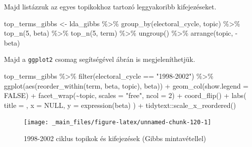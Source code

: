 \documentclass[
]{book}
\newenvironment{Shaded}{\begin{snugshade}}{\end{snugshade}}
\newcommand{\AttributeTok}[1]{\textcolor[rgb]{0.77,0.63,0.00}{#1}}
\newcommand{\ConstantTok}[1]{\textcolor[rgb]{0.00,0.00,0.00}{#1}}
\newcommand{\DecValTok}[1]{\textcolor[rgb]{0.00,0.00,0.81}{#1}}
\newcommand{\FunctionTok}[1]{\textcolor[rgb]{0.00,0.00,0.00}{#1}}
\newcommand{\NormalTok}[1]{#1}
\newcommand{\OtherTok}[1]{\textcolor[rgb]{0.56,0.35,0.01}{#1}}
\newcommand{\SpecialCharTok}[1]{\textcolor[rgb]{0.00,0.00,0.00}{#1}}
\newcommand{\StringTok}[1]{\textcolor[rgb]{0.31,0.60,0.02}{#1}}
\begin{document}
Majd listázzuk az egyes topikokhoz tartozó leggyakoribb kifejezéseket.

\begin{Shaded}
\begin{Highlighting}[]
\NormalTok{top\_terms\_gibbs }\OtherTok{\textless{}{-}}\NormalTok{ lda\_gibbs }\SpecialCharTok{\%\textgreater{}\%}
  \FunctionTok{group\_by}\NormalTok{(electoral\_cycle, topic) }\SpecialCharTok{\%\textgreater{}\%}
  \FunctionTok{top\_n}\NormalTok{(}\DecValTok{5}\NormalTok{, beta) }\SpecialCharTok{\%\textgreater{}\%}
  \FunctionTok{top\_n}\NormalTok{(}\DecValTok{5}\NormalTok{, term) }\SpecialCharTok{\%\textgreater{}\%}
  \FunctionTok{ungroup}\NormalTok{() }\SpecialCharTok{\%\textgreater{}\%}
  \FunctionTok{arrange}\NormalTok{(topic, }\SpecialCharTok{{-}}\NormalTok{beta)}
\end{Highlighting}
\end{Shaded}

Majd a \texttt{ggplot2} csomag segítségével ábrán is megjeleníthetjük.

\begin{Shaded}
\begin{Highlighting}[]
\NormalTok{top\_terms\_gibbs }\SpecialCharTok{\%\textgreater{}\%}
  \FunctionTok{filter}\NormalTok{(electoral\_cycle }\SpecialCharTok{==} \StringTok{"1998{-}2002"}\NormalTok{) }\SpecialCharTok{\%\textgreater{}\%}
  \FunctionTok{ggplot}\NormalTok{(}\FunctionTok{aes}\NormalTok{(}\FunctionTok{reorder\_within}\NormalTok{(term, beta, topic), beta)) }\SpecialCharTok{+}
  \FunctionTok{geom\_col}\NormalTok{(}\AttributeTok{show.legend =} \ConstantTok{FALSE}\NormalTok{) }\SpecialCharTok{+}
  \FunctionTok{facet\_wrap}\NormalTok{(}\SpecialCharTok{\textasciitilde{}}\NormalTok{topic, }\AttributeTok{scales =} \StringTok{"free"}\NormalTok{, }\AttributeTok{ncol =} \DecValTok{2}\NormalTok{) }\SpecialCharTok{+}
  \FunctionTok{coord\_flip}\NormalTok{() }\SpecialCharTok{+}
  \FunctionTok{labs}\NormalTok{(}
    \AttributeTok{title =}\NormalTok{ ,}
    \AttributeTok{x =} \ConstantTok{NULL}\NormalTok{,}
    \AttributeTok{y =} \FunctionTok{expression}\NormalTok{(beta)}
\NormalTok{  ) }\SpecialCharTok{+}
\NormalTok{  tidytext}\SpecialCharTok{::}\FunctionTok{scale\_x\_reordered}\NormalTok{()}
\end{Highlighting}
\end{Shaded}

\begin{figure}

{\centering \texttt{[image: \_main\_files/figure-latex/unnamed-chunk-120-1]} 

}

\caption{1998-2002 ciklus topikok és kifejezések (Gibbs mintavétellel)}\label{fig:unnamed-chunk-120}
\end{figure}
\end{document}
